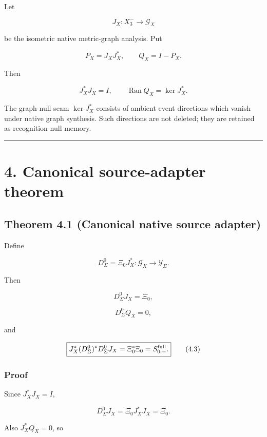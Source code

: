 Let

\[
J_X:X_3^-\longrightarrow\mathcal G_X
\]

be the isometric native metric-graph analysis. Put

\[
P_X=J_XJ_X^*,
\qquad
Q_X=I-P_X.
\]

Then

\[
J_X^*J_X=I,
\qquad
\operatorname{Ran}Q_X=\ker J_X^*.
\]

The graph-null seam \(\ker J_X^*\) consists of ambient event directions which
vanish under native graph synthesis. Such directions are not deleted; they
are retained as recognition-null memory.

\begin{center}\rule{0.5\linewidth}{0.5pt}\end{center}

\hypertarget{canonical-source-adapter-theorem}{%
\section{4. Canonical source-adapter theorem}\label{canonical-source-adapter-theorem}}

\hypertarget{theorem-4.1-canonical-native-source-adapter}{%
\subsection{Theorem 4.1 (Canonical native source adapter)}\label{theorem-4.1-canonical-native-source-adapter}}

Define

\[
\boxed{
D_\Sigma^0
=
\Xi_0J_X^*:
\mathcal G_X\longrightarrow\mathcal Y_\Sigma.
}
\]

Then

\[
\boxed{
D_\Sigma^0J_X=\Xi_0,
}
\tag{4.1}
\]

\[
\boxed{
D_\Sigma^0Q_X=0,
}
\tag{4.2}
\]

and

\[
\boxed{
J_X^*(D_\Sigma^0)^*D_\Sigma^0J_X
=
\Xi_0^*\Xi_0
=
S_{0,-}^{\rm full}.
}
\tag{4.3}
\]

\hypertarget{proof}{%
\subsubsection{Proof}\label{proof}}

Since \(J_X^*J_X=I\),

\[
D_\Sigma^0J_X
=
\Xi_0J_X^*J_X
=
\Xi_0.
\]

Also \(J_X^*Q_X=0\), so

